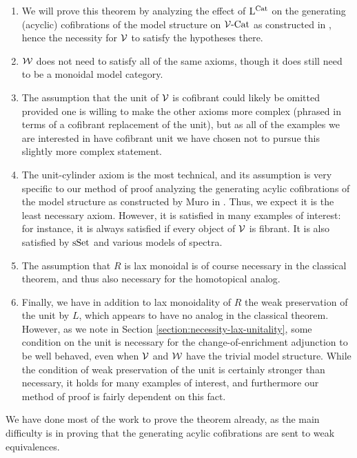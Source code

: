 \documentclass[12pt]{amsart}
\begin{document}
\begin{enumerate}
	\item We will prove this theorem by analyzing the effect of $\mathrm{L}^{\mathrm{Cat}}$ on the generating (acyclic) cofibrations of the model structure on $\mathcal{V}\text{-}\mathrm{Cat}$ as constructed in \cite{Muro2012}, hence the necessity for $\mathcal{V}$ to satisfy the hypotheses there. 
	\item $\mathcal{W}$ does not need to satisfy all of the same axioms, though it does still need to be a monoidal model category.
	\item The assumption that the unit of $\mathcal{V}$ is cofibrant could likely be omitted provided one is willing to make the other axioms more complex (phrased in terms of a cofibrant replacement of the unit), but as all of the examples we are interested in have cofibrant unit we have chosen not to pursue this slightly more complex statement. 
	\item The unit-cylinder axiom is the most technical, and its assumption is very specific to our method of proof analyzing the generating acylic cofibrations of the model structure as constructed by Muro in \cite{Muro2012}. 
	Thus, we expect it is the least necessary axiom. 
	However, it is satisfied in many examples of interest: for instance, it is always satisfied if every object of $\mathcal{V}$ is fibrant. 
	It is also satisfied by $\mathrm{sSet}$ and various models of spectra. 
	\item The assumption that $R$ is lax monoidal is of course necessary in the classical theorem, and thus also necessary for the homotopical analog.
	\item Finally, we have in addition to lax monoidality of $R$ the weak preservation of the unit by $L$, which appears to have no analog in the classical theorem. 
However, as we note in Section \ref{section:necessity-lax-unitality}, some condition on the unit is necessary for the change-of-enrichment adjunction to be well behaved, even when $\mathcal{V}$ and $\mathcal{W}$ have the trivial model structure. 
While the condition of weak preservation of the unit is certainly stronger than necessary, it holds for many examples of interest, and furthermore our method of proof is fairly dependent on this fact.
\end{enumerate}
We have done most of the work to prove the theorem already, as the main difficulty is in proving that the generating acylic cofibrations are sent to weak equivalences. 
\end{document}
